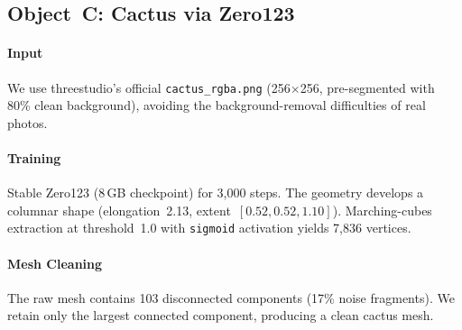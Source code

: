 \documentclass[10pt,twocolumn,letterpaper]{article}
\begin{document}
\begin{table}[h]
\centering
\caption{Object~B optimization metrics.}
\label{tab:objB_opt}
\end{table}

\subsection{Object~C: Cactus via Zero123}

\paragraph{Input} We use threestudio's official \texttt{cactus\_rgba.png} (256$\times$256, pre-segmented with 80\% clean background), avoiding the background-removal difficulties of real photos.

\paragraph{Training} Stable Zero123 (8\,GB checkpoint) for 3{,}000 steps. The geometry develops a columnar shape (elongation~2.13, extent~$[0.52, 0.52, 1.10]$). Marching-cubes extraction at threshold~1.0 with \texttt{sigmoid} activation yields 7{,}836 vertices.

\paragraph{Mesh Cleaning} The raw mesh contains 103 disconnected components (17\% noise fragments). We retain only the largest connected component, producing a clean cactus mesh.
\end{document}
